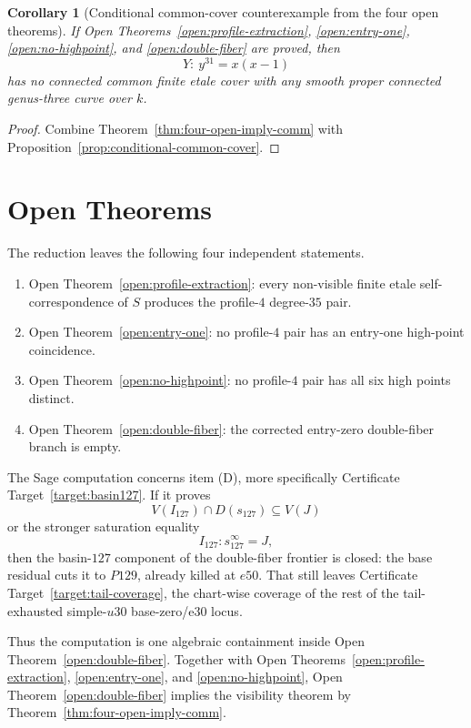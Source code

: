 \documentclass[11pt]{amsart}
\newtheorem{corollary}[theorem]{Corollary}
\begin{document}
\begin{corollary}[Conditional common-cover counterexample from the four open theorems]
If Open Theorems~\ref{open:profile-extraction}, \ref{open:entry-one},
\ref{open:no-highpoint}, and \ref{open:double-fiber} are proved, then
\[
  Y:\ y^{31}=x(x-1)
\]
has no connected common finite etale cover with any smooth proper connected
genus-three curve over \(k\).
\end{corollary}

\begin{proof}
Combine Theorem~\ref{thm:four-open-imply-comm} with
Proposition~\ref{prop:conditional-common-cover}.
\end{proof}

\section{Open Theorems}

The reduction leaves the following four independent statements.
\begin{enumerate}[label=\textnormal{(\Alph*)},leftmargin=2.2em]
\item Open Theorem~\ref{open:profile-extraction}: every non-visible
  finite etale self-correspondence of \(S\) produces the profile-\(4\)
  degree-\(35\) pair.
\item Open Theorem~\ref{open:entry-one}: no profile-\(4\) pair has an
  entry-one high-point coincidence.
\item Open Theorem~\ref{open:no-highpoint}: no profile-\(4\) pair has
  all six high points distinct.
\item Open Theorem~\ref{open:double-fiber}: the corrected entry-zero
  double-fiber branch is empty.
\end{enumerate}

The Sage computation concerns item (D), more specifically Certificate
Target~\ref{target:basin127}.  If it proves
\[
  V(I_{127})\cap D(s_{127})\subseteq V(J)
\]
or the stronger saturation equality
\[
  I_{127}:s_{127}^{\infty}=J,
\]
then the basin-\(127\) component of the double-fiber frontier is closed: the
base residual cuts it to \(P129\), already killed at \(e50\).  That still
leaves Certificate Target~\ref{target:tail-coverage}, the chart-wise coverage
of the rest of the tail-exhausted simple-\(u30\) base-zero/e30 locus.

Thus the computation is one algebraic containment inside Open
Theorem~\ref{open:double-fiber}.  Together with Open
Theorems~\ref{open:profile-extraction}, \ref{open:entry-one}, and
\ref{open:no-highpoint}, Open Theorem~\ref{open:double-fiber} implies the
visibility theorem by Theorem~\ref{thm:four-open-imply-comm}.
\end{document}

